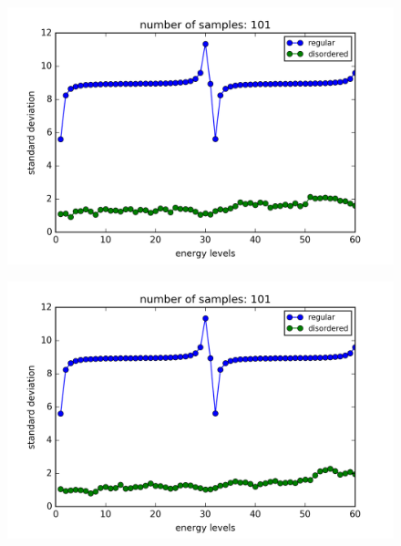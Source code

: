 \begin{figure}[!htbh]
\centering
\begin{minipage}{.45\textwidth}
  \centering
  \includegraphics[width=1.1\linewidth]{standardDeviation/N_31_100a30_well0_4_p_0_5.png}
  \label{fig:disordered sys num 7}
\end{minipage}\qquad
\begin{minipage}{.45\textwidth}
  \centering
  \includegraphics[width=1.1\linewidth]{standardDeviation/N_31_100a30_well0_2_p_0_5.png}
  \label{fig:disordered sys num 8}
\end{minipage}
\end{figure}


